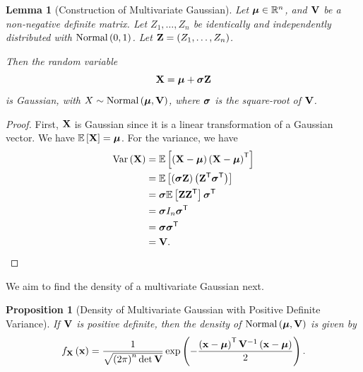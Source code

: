 \documentclass{article}
\newtheorem{lemma}[theorem]{Lemma}
\newtheorem{proposition}[theorem]{Proposition}
\theoremstyle{definition}
\theoremstyle{remark}
\newcommand{\RR}{\mathbb{R}}
\newcommand{\Expt}{\mathbb{E}}
\newcommand{\inverse}{^{-1}}
\newcommand{\transpose}{^{\mathsf{T}}}
\newcommand{\identityM}{I}
\newcommand{\Var}{\operatorname{Var}}
\newcommand{\Normal}{\operatorname{Normal}}
\begin{document}
\begin{lemma}[Construction of Multivariate Gaussian]
    \label{lem:construction-multivariate-gaussian}%
    Let \(\vb*{\mu} \in \RR^n\), and \(\vb{V}\) be a non-negative definite matrix. Let \(Z_1, \ldots, Z_n\) be identically and independently distributed with \(\Normal\pqty{0, 1}\). Let \(\vb{Z} = \pqty{Z_1, \ldots, Z_n}\).

    Then the random variable
    \[
        \vb{X} = \vb*{\mu} + \vb*{\sigma} \vb{Z}
    \]
    is Gaussian, with \(X \sim \Normal\pqty{\vb*{\mu}, \vb{V}}\), where \(\vb*{\sigma}\) is the square-root of \(\vb{V}\).
\end{lemma}

\begin{proof}
    First, \(\vb{X}\) is Gaussian since it is a linear transformation of a Gaussian vector. We have \(\Expt\bqty{\vb{X}} = \vb*{\mu}\). For the variance, we have
    \begin{align*}
        \Var\pqty{\vb{X}} &= \Expt\bqty{\pqty{\vb{X} - \vb*{\mu}} \pqty{\vb{X} - \vb*{\mu}}\transpose} \\
        &= \Expt\bqty{\pqty{\vb*{\sigma} \vb{Z}} \pqty{\vb{Z}\transpose \vb*{\sigma}\transpose}} \\
        &= \vb*{\sigma} \Expt\bqty{\vb{Z} \vb{Z}\transpose} \vb*{\sigma}\transpose \\
        &= \vb*{\sigma} \identityM_n \vb*{\sigma}\transpose \\
        &= \vb*{\sigma} \vb*{\sigma}\transpose \\
        &= \vb{V}.
    \end{align*}
\end{proof}

We aim to find the density of a multivariate Gaussian next.

\begin{proposition}[Density of Multivariate Gaussian with Positive Definite Variance]
    If \(\vb{V}\) is positive definite, then the density of \(\Normal\pqty{\vb*{\mu}, \vb{V}}\) is given by
    \[
        f_{\vb{X}}\pqty{\vb{x}} = \frac{1}{\sqrt{\pqty{2\pi}^n \det \vb{V}}} \exp\pqty{- \frac{\pqty{\vb{x} - \vb*{\mu}}\transpose \vb{V}\inverse \pqty{\vb{x} - \vb*{\mu}}}{2}}.
    \]
\end{proposition}
\end{document}
